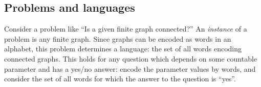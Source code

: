 

\setcounter{section}{8}
\setcounter{subsection}{3}
\setcounter{dfn}{4}

\subsection{Problems and languages}
Consider a problem like ``Is a given finite graph connected?''
An \emph{instance} of a problem is any finite graph.
Since graphs can be encoded as words in an alphabet, this problem determines a language:
the set of all words encoding connected graphs.
This holds for any question which depends on some countable parameter and has a yes/no answer:
encode the parameter values by words, and consider the set of all words for which the answer to the question is ``yes''.


